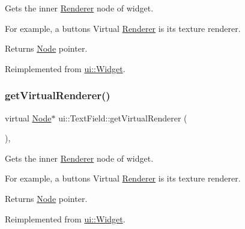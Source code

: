 Gets the inner \hyperlink{classRenderer}{Renderer} node of widget.

For example, a button\textquotesingle{}s Virtual \hyperlink{classRenderer}{Renderer} is it\textquotesingle{}s texture renderer.

\begin{DoxyReturn}{Returns}
\hyperlink{classNode}{Node} pointer. 
\end{DoxyReturn}


Reimplemented from \hyperlink{classui_1_1Widget_acf862bf9235fbb3823819eeb65d46f25}{ui\+::\+Widget}.

\mbox{\label{classui_1_1TextField_a517f950a59caa4ec02a9245beb6d7283}} 
\subsubsection{\texorpdfstring{get\+Virtual\+Renderer()}{getVirtualRenderer()}\hspace{0.1cm}{\footnotesize\ttfamily [2/2]}}
{\footnotesize\ttfamily virtual \hyperlink{classNode}{Node}$\ast$ ui\+::\+Text\+Field\+::get\+Virtual\+Renderer (\begin{DoxyParamCaption}{ }\end{DoxyParamCaption})\hspace{0.3cm}{\ttfamily [override]}, {\ttfamily [virtual]}}

Gets the inner \hyperlink{classRenderer}{Renderer} node of widget.

For example, a button\textquotesingle{}s Virtual \hyperlink{classRenderer}{Renderer} is it\textquotesingle{}s texture renderer.

\begin{DoxyReturn}{Returns}
\hyperlink{classNode}{Node} pointer. 
\end{DoxyReturn}


Reimplemented from \hyperlink{classui_1_1Widget_acf862bf9235fbb3823819eeb65d46f25}{ui\+::\+Widget}.

\mbox{\label{classui_1_1TextField_a1ca24c7493ae07def476b7715f668390}} 
